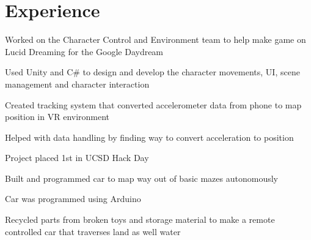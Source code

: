 \documentclass[]{deedy-resume-openfont}
\begin{document}
\hfill
\begin{minipage}[t]{0.66\textwidth} 


\section{Experience}

\sectionsep
\begin{tightemize} 
\item Worked on the Character Control and Environment team to help make game on Lucid Dreaming for the Google Daydream
\item Used Unity and C\# to design and develop the character movements, UI, scene management and character interaction
\end{tightemize}
\sectionsep

\begin{tightemize}
\item Created tracking system that converted accelerometer data from phone to map position in VR environment
\item Helped with data handling by finding way to convert acceleration to position
\item Project placed 1st in UCSD Hack Day
\end{tightemize}
\sectionsep

\begin{tightemize}
\item Built and programmed car to map way out of basic mazes autonomously
\item Car was programmed using Arduino
\end{tightemize}
\sectionsep

\begin{tightemize}
\item Recycled parts from broken toys and storage material to make a remote controlled car that traverses land as well water
\end{tightemize}
\sectionsep


\end{minipage}
\end{document}
